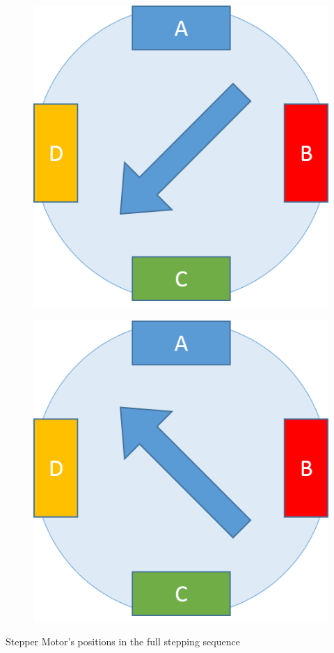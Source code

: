 \documentclass[table,10pt,red]{beamer}	%
\begin{document}
\begin{frame}
\begin{minipage}[c]{0.24\textwidth}
\begin{figure}
		\end{figure}
	\end{minipage}
	\begin{minipage}[c]{0.24\textwidth}
		\begin{figure}
			\includegraphics[width=0.9\linewidth]{step6}
		\end{figure}
	\end{minipage}
	\begin{minipage}[c]{0.24\textwidth}
		\begin{figure}
			\includegraphics[width=0.9\linewidth]{step8}
		\end{figure}
	\end{minipage}
	\begin{center}
		Stepper Motor's positions in the full stepping sequence
	\end{center}
\end{frame}
\end{document}
